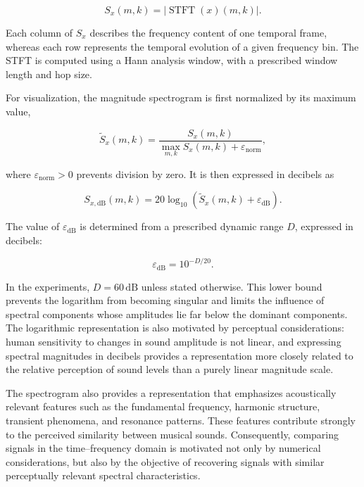 \documentclass[11pt,a4paper]{report}
\theoremstyle{plain}
\theoremstyle{definition}
\begin{document}
\begin{equation}
S_x(m,k)
=
\left|
\operatorname{STFT}(x)(m,k)
\right|.
\label{eq:spectrogram}
\end{equation}

Each column of \(S_x\) describes the frequency content of one temporal frame,
whereas each row represents the temporal evolution of a given frequency bin.
The STFT is computed using a Hann analysis window, with a prescribed window
length and hop size.

For visualization, the magnitude spectrogram is first normalized by its maximum
value,

\begin{equation}
\widetilde{S}_x(m,k)
=
\frac{
S_x(m,k)
}{
\displaystyle \max_{m,k} S_x(m,k) + \varepsilon_{\mathrm{norm}}
},
\label{eq:normalized_spectrogram}
\end{equation}

where \(\varepsilon_{\mathrm{norm}}>0\) prevents division by zero. It is then
expressed in decibels as

\begin{equation}
S_{x,\mathrm{dB}}(m,k)
=
20\log_{10}
\left(
\widetilde{S}_x(m,k)
+
\varepsilon_{\mathrm{dB}}
\right).
\label{eq:log_spectrogram}
\end{equation}

The value of \(\varepsilon_{\mathrm{dB}}\) is determined from a prescribed
dynamic range \(D\), expressed in decibels:

\begin{equation}
\varepsilon_{\mathrm{dB}}
=
10^{-D/20}.
\label{eq:dynamic_range_epsilon}
\end{equation}

In the experiments, \(D=60\,\mathrm{dB}\) unless stated otherwise. This lower
bound prevents the logarithm from becoming singular and limits the influence
of spectral components whose amplitudes lie far below the dominant components.
The logarithmic representation is also motivated by perceptual considerations:
human sensitivity to changes in sound amplitude is not linear, and expressing
spectral magnitudes in decibels provides a representation more closely related
to the relative perception of sound levels than a purely linear magnitude
scale.

The spectrogram also provides a representation that emphasizes acoustically
relevant features such as the fundamental frequency, harmonic structure,
transient phenomena, and resonance patterns. These features contribute
strongly to the perceived similarity between musical sounds. Consequently,
comparing signals in the time--frequency domain is motivated not only by
numerical considerations, but also by the objective of recovering signals
with similar perceptually relevant spectral characteristics.
\end{document}
